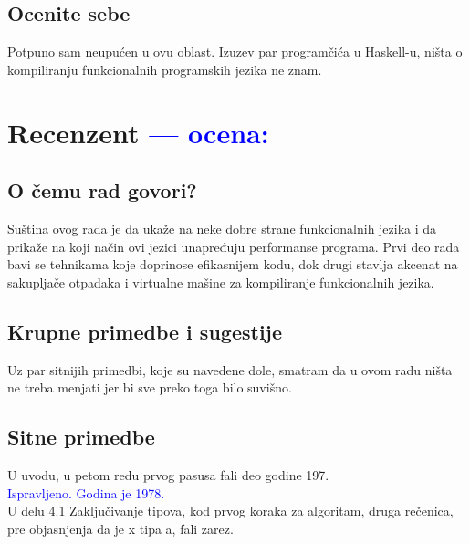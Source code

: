 \documentclass[a4paper]{report}
\newcommand{\odgovor}[1]{\textcolor{blue}{#1}}
\begin{document}
\section{Ocenite sebe}
Potpuno sam neupućen u ovu oblast. Izuzev par programčića u Haskell-u, ništa o kompiliranju funkcionalnih programskih jezika ne znam.

\chapter{Recenzent \odgovor{--- ocena:} }


\section{O čemu rad govori?}
Suština ovog rada je da ukaže na neke dobre strane funkcionalnih jezika i da prikaže na koji način ovi jezici unapređuju performanse programa.
Prvi deo rada bavi se tehnikama koje doprinose efikasnijem kodu, dok drugi stavlja akcenat na sakupljače otpadaka i virtualne mašine za kompiliranje funkcionalnih jezika. 

\section{Krupne primedbe i sugestije}
Uz par sitnijih primedbi, koje su navedene dole, smatram da u ovom radu ništa ne treba menjati jer bi sve preko toga bilo suvišno.


\section{Sitne primedbe}

U uvodu, u petom redu prvog pasusa fali deo godine 197. \\

\odgovor{Ispravljeno. Godina je 1978.}\\

U delu 4.1 Zaključivanje tipova, kod prvog koraka za algoritam, druga rečenica, pre objasnjenja da je x tipa a, fali zarez. \\
\end{document}
